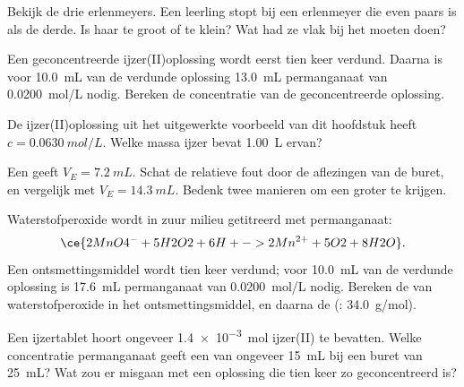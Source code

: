 \begin{exercise}[$\star\star$]\label{exo:g11:titration:9}
Bekijk de drie erlenmeyers. Een leerling stopt bij een erlenmeyer die
even paars is als de derde. Is haar  te groot of te
klein? Wat had ze vlak bij het  moeten doen?
\end{exercise}

\begin{exercise}[$\star\star$]\label{exo:g11:titration:10}
Een geconcentreerde ijzer(II)oplossing wordt eerst tien keer verdund.
Daarna is voor \qty{10.0}{mL} van de verdunde oplossing \qty{13.0}{mL}
permanganaat van \qty{0.0200}{mol/L} nodig. Bereken de concentratie van
de geconcentreerde oplossing.
\end{exercise}

\begin{exercise}[$\star\star$]\label{exo:g11:titration:11}
De ijzer(II)oplossing uit het uitgewerkte voorbeeld van dit hoofdstuk
heeft $c = \qty{0.0630}{mol/L}$. Welke massa ijzer bevat \qty{1.00}{L}
ervan?
\end{exercise}

\begin{exercise}[$\star\star\star$]\label{exo:g11:titration:12}
Een  geeft $V_E = \qty{7.2}{mL}$. Schat de relatieve fout door
de aflezingen van de buret, en vergelijk met $V_E = \qty{14.3}{mL}$.
Bedenk twee manieren om een groter  te krijgen.
\end{exercise}

\begin{exercise}[$\star\star\star$]\label{exo:g11:titration:13}
Waterstofperoxide wordt in zuur milieu getitreerd met permanganaat:
\[
  \ce{2MnO4^- + 5H2O2 + 6H+ -> 2Mn^{2+} + 5O2 + 8H2O} .
\]
Een ontsmettingsmiddel wordt tien keer verdund; voor \qty{10.0}{mL} van
de verdunde oplossing is \qty{17.6}{mL} permanganaat van
\qty{0.0200}{mol/L} nodig. Bereken de  van
waterstofperoxide in het ontsmettingsmiddel, en daarna de
 (: \qty{34.0}{g/mol}).
\end{exercise}

\begin{exercise}[$\star\star\star$]\label{exo:g11:titration:14}
Een ijzertablet hoort ongeveer \qty{1.4e-3}{mol} ijzer(II) te bevatten.
Welke concentratie permanganaat geeft een  van
ongeveer \qty{15}{mL} bij een buret van \qty{25}{mL}? Wat zou er
misgaan met een oplossing die tien keer zo geconcentreerd is?
\end{exercise}

